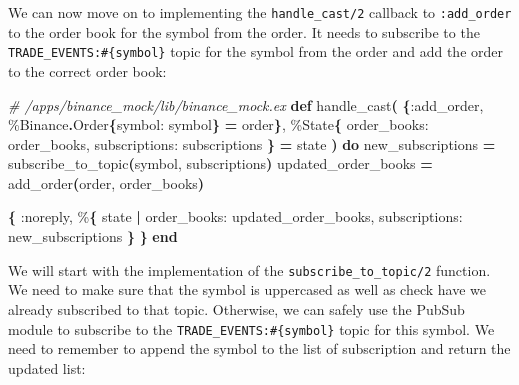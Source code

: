 \documentclass[
  oneside]{book}
\newenvironment{Shaded}{\begin{snugshade}}{\end{snugshade}}
\newcommand{\CommentTok}[1]{\textcolor[rgb]{0.56,0.35,0.01}{\textit{#1}}}
\newcommand{\ConstantTok}[1]{\textcolor[rgb]{0.56,0.35,0.01}{#1}}
\newcommand{\FunctionTok}[1]{\textcolor[rgb]{0.13,0.29,0.53}{\textbf{#1}}}
\newcommand{\KeywordTok}[1]{\textcolor[rgb]{0.13,0.29,0.53}{\textbf{#1}}}
\newcommand{\NormalTok}[1]{#1}
\newcommand{\OperatorTok}[1]{\textcolor[rgb]{0.81,0.36,0.00}{\textbf{#1}}}
\newcommand{\VariableTok}[1]{\textcolor[rgb]{0.00,0.00,0.00}{#1}}
\begin{document}
\newpage

We can now move on to implementing the \texttt{handle\_cast/2} callback to \texttt{:add\_order} to the order book for the symbol from the order.
It needs to subscribe to the \texttt{TRADE\_EVENTS:\#\{symbol\}} topic for the symbol from the order and add the order to the correct order book:

\begin{Shaded}
\begin{Highlighting}[]
\CommentTok{\# /apps/binance\_mock/lib/binance\_mock.ex}
  \KeywordTok{def}\NormalTok{ handle\_cast}\FunctionTok{(}
        \FunctionTok{\{}\VariableTok{:add\_order}\NormalTok{, \%}\ConstantTok{Binance}\OperatorTok{.}\ConstantTok{Order}\FunctionTok{\{}\VariableTok{symbol:}\NormalTok{ symbol}\FunctionTok{\}} \OperatorTok{=}\NormalTok{ order}\FunctionTok{\}}\NormalTok{,}
\NormalTok{        \%}\ConstantTok{State}\FunctionTok{\{}
          \VariableTok{order\_books:}\NormalTok{ order\_books,}
          \VariableTok{subscriptions:}\NormalTok{ subscriptions}
        \FunctionTok{\}} \OperatorTok{=}\NormalTok{ state}
      \FunctionTok{)} \KeywordTok{do}
\NormalTok{    new\_subscriptions }\OperatorTok{=}\NormalTok{ subscribe\_to\_topic}\FunctionTok{(}\NormalTok{symbol, subscriptions}\FunctionTok{)}
\NormalTok{    updated\_order\_books }\OperatorTok{=}\NormalTok{ add\_order}\FunctionTok{(}\NormalTok{order, order\_books}\FunctionTok{)}

    \FunctionTok{\{}
      \VariableTok{:noreply}\NormalTok{,}
\NormalTok{      \%}\FunctionTok{\{}
\NormalTok{        state}
        \OperatorTok{|} \VariableTok{order\_books:}\NormalTok{ updated\_order\_books,}
          \VariableTok{subscriptions:}\NormalTok{ new\_subscriptions}
      \FunctionTok{\}}
    \FunctionTok{\}}
  \KeywordTok{end}
\end{Highlighting}
\end{Shaded}

We will start with the implementation of the \texttt{subscribe\_to\_topic/2} function. We need to make sure that the symbol is uppercased as well as check have we already subscribed to that topic. Otherwise, we can safely use the PubSub module to subscribe to the \texttt{TRADE\_EVENTS:\#\{symbol\}} topic for this symbol.
We need to remember to append the symbol to the list of subscription and return the updated list:
\end{document}
